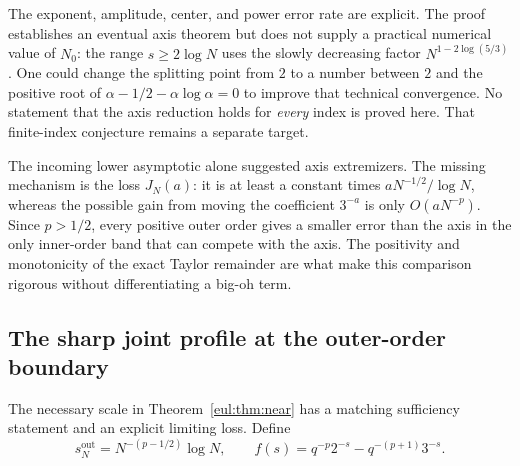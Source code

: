 \begin{remark}
The exponent, amplitude, center, and power error rate are explicit.
The proof establishes an eventual axis theorem but does not supply a
practical numerical value of $N_0$: the range
$s\geq2\log N$ uses the slowly decreasing factor
$N^{1-2\log(5/3)}$.  One could change the splitting point from $2$
to a number between $2$ and the positive root of
$\alpha-1/2-\alpha\log\alpha=0$ to improve that technical convergence.
No statement that the axis reduction holds for \emph{every} index is
proved here.  That finite-index conjecture remains a separate target.
\end{remark}

\begin{remark}
The incoming lower asymptotic alone suggested axis extremizers.
The missing mechanism is the loss $J_N(a)$: it is at least a constant
times $aN^{-1/2}/\log N$, whereas the possible gain from moving the
coefficient $3^{-a}$ is only $O(aN^{-p})$.
Since $p>1/2$, every positive outer order gives a smaller error than the axis in the
only inner-order band that can compete with the axis.
The positivity and monotonicity of the exact Taylor remainder are
what make this comparison rigorous without differentiating a big-oh term.
\end{remark}

\subsection{The sharp joint profile at the outer-order boundary}

The necessary scale in Theorem~\ref{eul:thm:near} has a matching
sufficiency statement and an explicit limiting loss. Define
\[
 s_N^{\mathrm{out}}=N^{-(p-1/2)}\log N,
 \qquad f(s)=q^{-p}2^{-s}-q^{-(p+1)}3^{-s}.
\]

